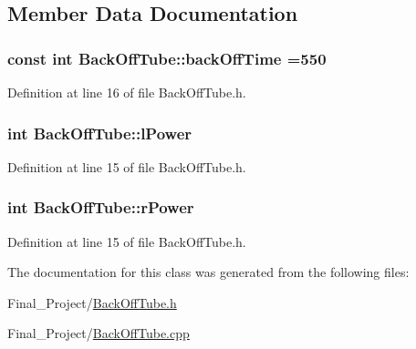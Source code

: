 \subsection{Member Data Documentation}
\hypertarget{classBackOffTube_a46fdecac50000c6b1e9ecae3e42ea4b4}{
\subsubsection[{back\-Off\-Time}]{\setlength{\rightskip}{0pt plus 5cm}const int Back\-Off\-Tube\-::back\-Off\-Time =550\hspace{0.3cm}{\ttfamily [private]}}}\label{classBackOffTube_a46fdecac50000c6b1e9ecae3e42ea4b4}


Definition at line 16 of file Back\-Off\-Tube.\-h.

\hypertarget{classBackOffTube_a5eee02bb4a6756ea44206e411211aea8}{
\subsubsection[{l\-Power}]{\setlength{\rightskip}{0pt plus 5cm}int Back\-Off\-Tube\-::l\-Power\hspace{0.3cm}{\ttfamily [private]}}}\label{classBackOffTube_a5eee02bb4a6756ea44206e411211aea8}


Definition at line 15 of file Back\-Off\-Tube.\-h.

\hypertarget{classBackOffTube_aa03d7c0535e3d7dd4c45a0453ea9f3aa}{
\subsubsection[{r\-Power}]{\setlength{\rightskip}{0pt plus 5cm}int Back\-Off\-Tube\-::r\-Power\hspace{0.3cm}{\ttfamily [private]}}}\label{classBackOffTube_aa03d7c0535e3d7dd4c45a0453ea9f3aa}


Definition at line 15 of file Back\-Off\-Tube.\-h.



The documentation for this class was generated from the following files\-:\begin{DoxyCompactItemize}
\item 
Final\-\_\-\-Project/\hyperlink{BackOffTube_8h}{Back\-Off\-Tube.\-h}\item 
Final\-\_\-\-Project/\hyperlink{BackOffTube_8cpp}{Back\-Off\-Tube.\-cpp}\end{DoxyCompactItemize}

